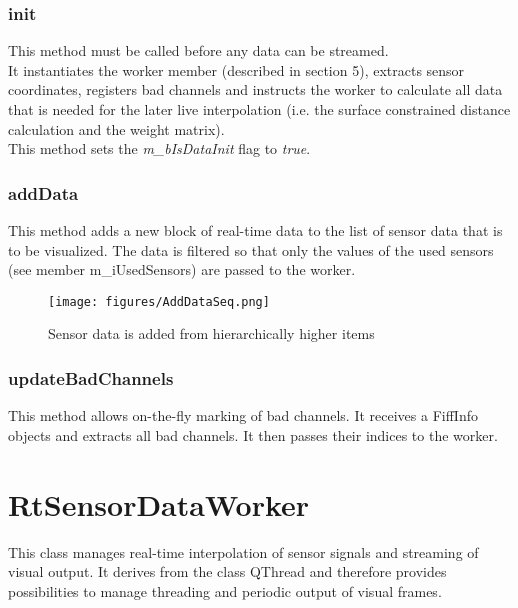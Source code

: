 \subsubsection{init}

This method must be called before any data can be streamed.\\
It instantiates the worker member (described in section 5), extracts sensor coordinates, registers bad channels and instructs the worker to calculate all data that is needed for the later live interpolation (i.e. the surface constrained distance calculation and the weight matrix).\\
This method sets the \textit{m\_bIsDataInit} flag to \textit{true}.

\subsubsection{addData}

This method adds a new block of real-time data to the list of sensor data that is to be visualized. The data is filtered so that only the values of the used sensors (see member m\_iUsedSensors) are passed to the worker.

\begin{figure}[h]
	\begin{center}
		\texttt{[image: figures/AddDataSeq.png]}
		\caption{Sensor data is added from hierarchically higher items}
	\end{center}
\end{figure}

\subsubsection{updateBadChannels}

This method allows on-the-fly marking of bad channels. It receives a FiffInfo objects and extracts all bad channels. It then passes their indices to the worker.

\clearpage

\section{RtSensorDataWorker}

This class manages real-time interpolation of sensor signals and streaming of visual output.
It derives from the class QThread and therefore provides possibilities to manage threading and periodic output of visual frames.

